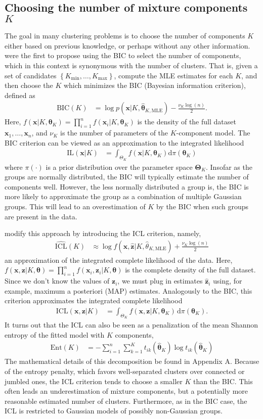 \documentclass{uwstat572}
\newcommand*\ba{\[ \begin{aligned}}
\newcommand*\ea{\end{aligned} \]}
\newcommand*\set[1]{\left\{#1\right\}}
\newcommand*\estim[1]{\widehat{#1}}
\newcommand*\der{\text{d}}
\newcommand*\bx{\mathbf{x}}
\newcommand*\bz{\mathbf{z}}
\newcommand*\btheta{\boldsymbol{\theta}}
\newcommand*\bTheta{\boldsymbol{\Theta}}
\renewcommand\;{\,}
\begin{document}
\subsection{Choosing the number of mixture components $K$}
The goal in many clustering problems is to choose the number of components $K$ either based on previous knowledge, or perhaps without any other information.
\citet{Dasgupta98} were the first to propose using the BIC to select the number of components, which in this context is synonymous with the number of clusters. 
That is, given a set of candidates $\set{K_\text{min}, \dotsc, K_\text{max}}$, compute the MLE estimates for each $K$, and then choose the $K$ which minimizes the BIC (Bayesian information criterion), defined as
\ba
\text{BIC}(K) 
	& = \log p(\bx | K, \estim\btheta_{K, \text{MLE}})
		- \frac{ \nu_K \log(n) }{2}.
\ea
Here,
$f(\bx | K, \btheta_K) = \prod_{i = 1}^n f(\bx_i | K, \btheta_K)$ is the density of the full dataset $\bx_1, \dotsc, \bx_n$, and
 $\nu_K$ is the number of parameters of the $K$-component model.
The BIC criterion can be viewed as an approximation to the integrated likelihood
\ba
\text{IL}(\bx | K)
	& = \int_{\Theta_K} f(\bx | K, \btheta_K) \der \pi(\btheta_K)
\ea
where $\pi(\cdot)$ is a prior distribution over the parameter space $\bTheta_K$.
Insofar as the groups are normally distributed, the BIC will typically estimate the number of components well.
However, the less normally distributed a group is, the BIC is more likely to approximate the group as a combination of multiple Gaussian groups.
This will lead to an overestimation of $K$ by the BIC when such groups are present in the data. 

\citet{Biernacki00} modify this approach by introducing the ICL criterion, namely,
\ba
\estim{\text{ICL}}(K)
	& \approx 
	\log f(\bx, \estim\bz | K, \estim\theta_{K, \text{MLE}}) + \frac{ \nu_K \log(n) }{2}
\ea
an approximation of the integrated complete likelihood of the data. 
Here, $f(\bx, \bz | K, \btheta) = \prod_{i=1}^n f(\bx_i, \bz_i | K, \btheta)$ is the complete density of the full dataset.
Since we don't know the values of $\bz_i$, we must plug in estimates $\estim\bz_i$ using, for example, maximum a posteriori (MAP) estimates.
Analogously to the BIC, this criterion approximates the integrated complete likelihood
\ba
\text{ICL}(\bx, \bz | K)
	& = \int_{\Theta_K} f(\bx, \bz | K, \btheta_K) \; \der \pi(\btheta_K).
\ea
It turns out that the ICL can also be seen as a penalization of the mean Shannon entropy of the fitted model with $K$ components, 
\ba
\text{Ent}(K)
	& = - \sum_{i=1}^n \sum_{k = 1}^K t_{ik}(\estim\btheta_K) \log t_{ik}(\estim\btheta_K)
\ea
The mathematical details of this decomposition be found in Appendix A.
Because of the entropy penalty, which favors well-separated clusters over connected or jumbled ones, the ICL criterion tends to choose a smaller $K$ than the BIC.
This often leads an underestimation of mixture components, but a potentially more reasonable estimated number of clusters.
Furthermore, as in the BIC case, the ICL is restricted to Gaussian models of possibly non-Gaussian groups.
\end{document}
